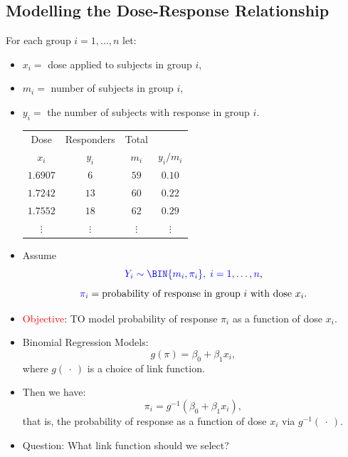 \documentclass{article}\usepackage[]{graphicx}\usepackage[svgnames]{xcolor}
\begin{document}
\subsection*{Modelling the Dose-Response Relationship}
For each group $ i=1,\ldots,n $ let:
\begin{itemize}
    \item $ x_i= $ dose applied to subjects in group $ i $,
    \item $ m_i= $ number of subjects in group $ i $,
    \item $ y_i= $ the number of subjects with response in group $ i $.
          \begin{table}[!htbp]
              \centering
              \begin{tabular}{cccc}
                  \toprule
                  Dose       & Responders & Total                  \\
                  $ x_i $    & $ y_i $    & $ m_i $  & $ y_i/m_i $ \\
                  \midrule
                  $ 1.6907 $ & $ 6 $      & $ 59 $   & $ 0.10 $    \\
                  $ 1.7242 $ & $ 13 $     & $ 60 $   & $ 0.22 $    \\
                  $ 1.7552 $ & $ 18 $     & $ 62 $   & $ 0.29 $    \\
                  $\vdots$   & $\vdots$   & $\vdots$ & $\vdots$    \\
                  \bottomrule
              \end{tabular}
          \end{table}
    \item Assume
          \[ \textcolor{Blue}{Y_i \sim \BIN{m_i,\pi_i},\; i=1,\ldots,n}, \]
          \[ \textcolor{Blue}{\pi_i} = \text{probability of response in group $ i $ with dose $ x_i $}. \]
    \item \textcolor{Red}{Objective}: TO model probability of response $ \pi_i $ as a function of dose $ x_i $.
    \item Binomial Regression Models:
          \[ g(\pi)=\beta_0+\beta_1x_i, \]
          where $ g(\:\cdot\:) $ is a choice of link function.
    \item Then we have:
          \[ \pi_i=g^{-1}(\beta_0+\beta_1x_i), \]
          that is, the probability of response as a function of dose $ x_i $ via $ g^{-1}(\:\cdot\:) $.
    \item Question: What link function should we select?
\end{itemize}
\end{document}

